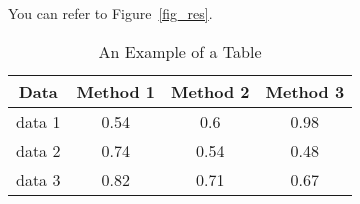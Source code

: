 \documentclass[a4paper,12pt]{article}
\newcommand{\initials}[1]{\marginpar{\quad\texttt{#1}}}
\begin{document}
You can refer to Figure~\ref{fig_res}.
\begin{table}[h]
\caption{An Example of a Table}
\label{tab_example}
\centering
\begin{tabular}{c||c|c|c}
Data & Method 1 & Method 2 & Method 3\\
\hline\hline
data 1 &0.54 & 0.6& 0.98\\
\hline
data 2 &0.74 & 0.54& 0.48\\
\hline
data 3 &0.82 & 0.71& 0.67
\end{tabular}
\end{table}

\initials{MA}  
\end{document}

